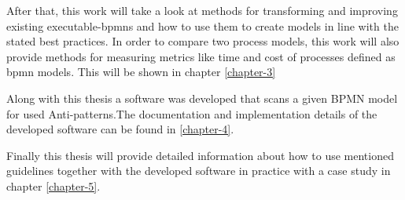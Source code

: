 After that, this work will take a look at methods for transforming and improving existing \gls{executable-bpmn}s and how to use them to create models in line with the stated best practices. In order to compare two process models, this work will also provide methods for measuring metrics like time and cost of processes defined as \gls{bpmn} models. This will be shown in chapter \ref{chapter-3}

Along with this thesis a software was developed that scans a given BPMN model for used Anti-patterns.The documentation and implementation details of the developed software can be found in \ref{chapter-4}.  

Finally this thesis will provide detailed information about how to use mentioned guidelines together with the developed software in practice with a case study in chapter \ref{chapter-5}.

